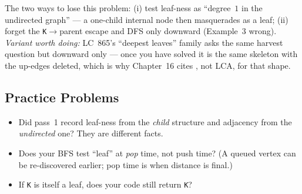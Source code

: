 \begin{warningbox}
The two ways to lose this problem: (i) test leaf-ness as ``degree~$1$ in the undirected
graph'' --- a one-child internal node then masquerades as a leaf; (ii) forget the
\texttt{K}$\to$parent escape and DFS only downward (Example~3 wrong). \emph{Variant
worth doing:} LC~865's ``deepest leaves'' family asks the same harvest question but
downward only --- once you have solved  it is the same skeleton with
the up-edges deleted, which is why Chapter~16 cites , not LCA, for that
shape.
\end{warningbox}

\subsection{Practice Problems}

\begin{stuckbox}
\begin{itemize}[nosep, leftmargin=1.4em]
  \item Did pass~1 record leaf-ness from the \emph{child} structure and adjacency from the
        \emph{undirected} one? They are different facts.
  \item Does your BFS test ``leaf'' at \emph{pop} time, not push time? (A queued vertex
        can be re-discovered earlier; pop time is when distance is final.)
  \item If \texttt{K} is itself a leaf, does your code still return \texttt{K}?
\end{itemize}
\end{stuckbox}


